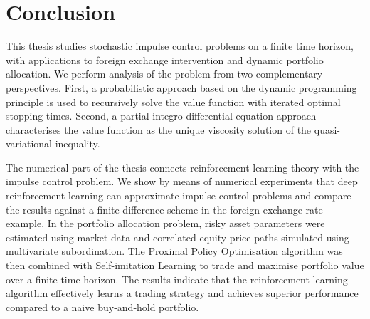 \label{section: concluding remarks}
\section*{Conclusion}
This thesis studies stochastic impulse control problems on a finite time horizon, with applications to foreign exchange intervention and dynamic portfolio allocation. We perform analysis of the problem from two complementary perspectives. First, a probabilistic approach based on the dynamic programming principle is used to recursively solve the value function with iterated optimal stopping times. Second, a partial integro-differential equation approach characterises the value function as the unique viscosity solution of the quasi-variational inequality. 

The numerical part of the thesis connects reinforcement learning theory with the impulse control problem. We show by means of numerical experiments that deep reinforcement learning can approximate impulse-control problems and compare the results against a finite-difference scheme in the foreign exchange rate example. In the portfolio allocation problem, risky asset parameters were estimated using market data and correlated equity price paths simulated using multivariate subordination. The Proximal Policy Optimisation algorithm was then combined with Self-imitation Learning to trade and maximise portfolio value over a finite time horizon. The results indicate that the reinforcement learning algorithm effectively learns a trading strategy and achieves superior performance compared to a naive buy‑and‑hold portfolio.

